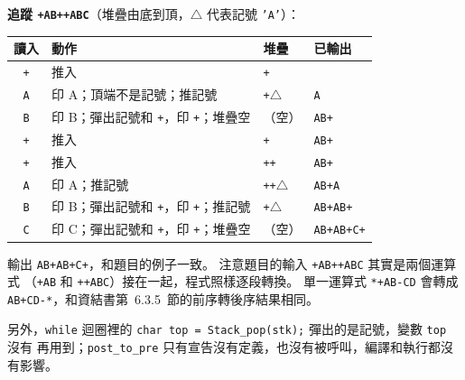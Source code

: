 \begin{pastsoln}
\textbf{追蹤 \texttt{+AB++ABC}}（堆疊由底到頂，$\triangle$ 代表記號 \texttt{'A'}）：
\begin{center}
\small
\begin{tabular}{clll}
\toprule
讀入 & 動作 & 堆疊 & 已輸出 \\
\midrule
\texttt{+} & 推入 & \texttt{+} & \\
\texttt{A} & 印 A；頂端不是記號；推記號 & \texttt{+}$\triangle$ & \texttt{A} \\
\texttt{B} & 印 B；彈出記號和 \texttt{+}，印 \texttt{+}；堆疊空 & （空） & \texttt{AB+} \\
\texttt{+} & 推入 & \texttt{+} & \texttt{AB+} \\
\texttt{+} & 推入 & \texttt{++} & \texttt{AB+} \\
\texttt{A} & 印 A；推記號 & \texttt{++}$\triangle$ & \texttt{AB+A} \\
\texttt{B} & 印 B；彈出記號和 \texttt{+}，印 \texttt{+}；推記號 & \texttt{+}$\triangle$ & \texttt{AB+AB+} \\
\texttt{C} & 印 C；彈出記號和 \texttt{+}，印 \texttt{+}；堆疊空 & （空） & \texttt{AB+AB+C+} \\
\bottomrule
\end{tabular}
\end{center}
輸出 \texttt{AB+AB+C+}，和題目的例子一致。 注意題目的輸入 \texttt{+AB++ABC} 其實是兩個運算式
（\texttt{+AB} 和 \texttt{++ABC}）接在一起，程式照樣逐段轉換。 單一運算式 \texttt{*+AB-CD} 會轉成
\texttt{AB+CD-*}，和資結書第~6.3.5~節的前序轉後序結果相同。

另外，\texttt{while} 迴圈裡的 \texttt{char top = Stack\_pop(stk);} 彈出的是記號，變數 \texttt{top} 沒有
再用到；\texttt{post\_to\_pre} 只有宣告沒有定義，也沒有被呼叫，編譯和執行都沒有影響。
\end{pastsoln}
